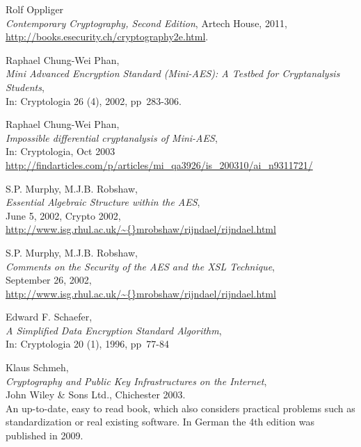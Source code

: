 \begin{thebibliography}{99999}
 
       Rolf Oppliger \\
       {\em Contemporary Cryptography, Second Edition},
       Artech House, 2011, \\
       \url{http://books.esecurity.ch/cryptography2e.html}.

  
       Raphael Chung-Wei Phan, \\
       {\em Mini Advanced Encryption Standard (Mini-AES): A Testbed for
            Cryptanalysis Students}, \\
       In: Cryptologia 26 (4), 2002, pp~283-306.

  
       Raphael Chung-Wei Phan, \\
       {\em Impossible differential cryptanalysis of Mini-AES}, \\
       In: Cryptologia, Oct 2003\\
       \url{http://findarticles.com/p/articles/mi_qa3926/is_200310/ai_n9311721/}

  
       S.P. Murphy, M.J.B. Robshaw, \\
       {\em Essential Algebraic Structure within the AES}, \\
       June 5, 2002, Crypto 2002,  \\
       \url{http://www.isg.rhul.ac.uk/\~{}mrobshaw/rijndael/rijndael.html}

  
       S.P. Murphy, M.J.B. Robshaw, \\
       {\em Comments on the Security of the AES and the XSL Technique}, \\
       September 26, 2002, \\
       \url{http://www.isg.rhul.ac.uk/\~{}mrobshaw/rijndael/rijndael.html}

  
       Edward F. Schaefer, \\
       {\em A Simplified Data Encryption Standard Algorithm}, \\
       In: Cryptologia 20 (1), 1996, pp~77-84

  
       Klaus Schmeh, \\
       {\em Cryptography and Public Key Infrastructures on the Internet},\\ 
       John Wiley \& Sons Ltd., Chichester 2003. \\
       An up-to-date, easy to read book, which also considers practical
       problems such as standardization or real existing software.
       In German the 4th edition was published in 2009.


\end{thebibliography}
